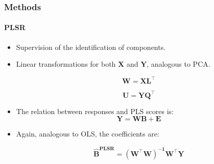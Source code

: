 \documentclass{beamer}
\begin{document}
\begin{frame}
	\frametitle{Methods}
	\framesubtitle{PLSR}
	
	\begin{itemize}
	
	\item Supervision of the identification of components.
	\item Linear transformations for both $\mathbf{X}$ and $\mathbf{Y}$, analogous to PCA.
	
	\begin{equation}
	\label{eqn:x-decomp}
	\mathbf{W=XL^\intercal}
	\end{equation}

\begin{equation}
	\label{eqn:y-decomp}
	\mathbf{U = YQ^\intercal}
\end{equation}


\item The relation between responses and PLS scores is:
	\begin{equation}
	\label{eqn:plsr}
	\mathbf{Y = WB + E}
\end{equation}

\item Again, analogous to OLS, the coefficients are:

\begin{equation}
	\label{eqn:beta-plsr}
	\mathbf{\hat{B}^{\text{PLSR}} = (W^\intercal W)^{-1}W^\intercal Y}
\end{equation}
\end{itemize}
		
\end{frame}
\end{document}
